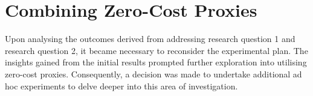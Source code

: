 \section{Combining Zero-Cost Proxies}

Upon analysing the outcomes derived from addressing research question 1 and research question 2, it became necessary to reconsider the experimental plan. The insights gained from the initial results prompted further exploration into utilising zero-cost proxies. Consequently, a decision was made to undertake additional ad hoc experiments to delve deeper into this area of investigation.





